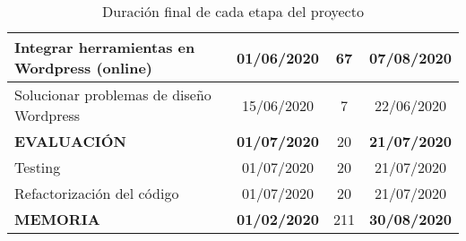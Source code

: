 \begin{table}[h]
{\begin{tabular}{lccc}
    \midrule
        Integrar herramientas en Wordpress (online) & 01/06/2020 & 67    & 07/08/2020 \\
    \midrule
        Solucionar problemas de diseño Wordpress & 15/06/2020 & 7     & 22/06/2020 \\
    \midrule
    \textbf{  EVALUACIÓN} & \textbf{01/07/2020} & 20    & \textbf{21/07/2020} \\
    \midrule
        Testing & 01/07/2020 & 20    & 21/07/2020 \\
    \midrule
        Refactorización del código & 01/07/2020 & 20    & 21/07/2020 \\
    \midrule
    \textbf{  MEMORIA} & \textbf{01/02/2020} & 211   & \textbf{30/08/2020} \\
    \bottomrule
    \end{tabular}%
    }
  \label{tab:horasfinales} \caption{Duración final de cada etapa del proyecto}
\end{table}%